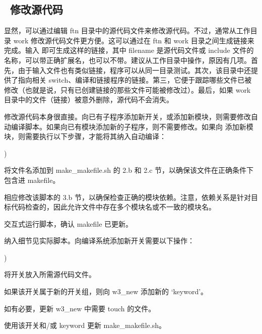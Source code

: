 \vssub
\subsection{~修改源代码} \label{sec:mod}
\vssub

显然，可以通过编辑 {\dir ftn} 目录中的源代码文件来修改源代码。不过，通常从工作目录 {\dir work} 修改源代码文件更方便。这可以通过在 {\dir ftn} 和 {\dir work} 目录之间生成链接来完成。输入  即可生成这样的链接，其中 {\code filename} 是源代码文件或 include 文件的名称，可以带正确扩展名，也可以不带。建议从工作目录中操作，原因有几项。首先，由于输入文件也有类似链接，程序可以从同一目录测试。其次，该目录中还提供了指向相关 switch、编译和链接程序的链接。第三，它便于跟踪哪些文件已被修改（也就是说，只有已创建链接的那些文件可能被修改过）。最后，如果 work 目录中的文件（链接）被意外删除，源代码不会消失。

修改源代码本身很直接。向已有子程序添加新开关，或添加新模块，则需要修改自动编译脚本。如果向已有模块添加新的子程序，则不需要修改。如果向 \ws{} 添加新模块，则需要执行以下步骤，才能将其纳入自动编译：

\begin{list}{)\hfill}
            { \leftmargin 15mm 
             \rightmargin 5mm \itemsep 0mm \parsep 0mm}
\item 将文件名添加到 {\file make\_makefile.sh} 的 2.b 和 2.c 节，以确保该文件在正确条件下包含进 makefile。
\item 相应修改该脚本的 3.b 节，以确保检查正确的模块依赖。注意，依赖关系是针对目标代码检查的，因此允许文件中存在多个模块名或不一致的模块名。
\item 交互式运行脚本，确认 makefile 已更新。
\end{list}

\noindent
纳入细节见实际脚本。向编译系统添加新开关需要以下操作：

\begin{list}{)\hfill}
            { \leftmargin 15mm 
             \rightmargin 5mm \itemsep 0mm \parsep 0mm}
\item 将开关放入所需源代码文件。
\item 如果该开关属于新的开关组，则向 {\file w3\_new} 添加新的 `keyword'。
\item 如有必要，更新 {\file w3\_new} 中需要 touch 的文件。
\item 使用该开关和/或 keyword 更新 {\file make\_makefile.sh}。
\end{list}

